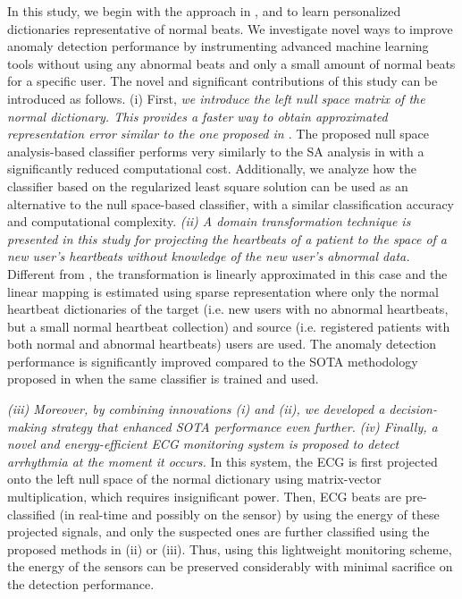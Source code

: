 \documentclass[journal,transmag]{IEEEtran}
\begin{document}
In this study, we begin with the approach in \cite{carrera2016ecg, Elad}, and \cite{carrera2019online} to learn personalized dictionaries representative of normal beats. We investigate novel ways to improve anomaly detection performance by instrumenting advanced machine learning tools without using any abnormal beats and only a small amount of normal beats for a specific user. The novel and significant contributions of this study can be introduced as follows. (i) First, \textit{we introduce the left null space matrix of the normal dictionary. This provides a faster way to obtain approximated representation error similar to the one proposed in \cite{carrera2016ecg, carrera2019online}}. The proposed null space analysis-based classifier performs very similarly to the SA analysis in \cite{carrera2016ecg, carrera2019online} with a significantly reduced computational cost. Additionally, we analyze how the classifier based on the regularized least square solution can be used as an alternative to the null space-based classifier, with a similar classification accuracy and computational complexity.
\textit{(ii) A domain transformation technique is presented in this study for projecting the heartbeats of a patient to the space of a new user's heartbeats without knowledge of the new user's abnormal data.} Different from \cite{kiranyaz2017personalized}, the transformation is linearly approximated in this case and the linear mapping is estimated using sparse representation where only the normal heartbeat dictionaries of the target (i.e. new users with no abnormal heartbeats, but a small normal heartbeat collection) and source (i.e. registered patients with both normal and abnormal heartbeats) users are used. The anomaly detection performance is significantly improved compared to the SOTA methodology proposed in \cite{kiranyaz2017personalized} when the same classifier is trained and used.

\textit{(iii) Moreover, by combining innovations (i) and (ii), we developed a decision-making strategy that enhanced SOTA performance even further.} \textit{(iv) Finally, a novel and energy-efficient ECG monitoring system is proposed to detect arrhythmia at the moment it occurs.} In this system, the ECG is first projected onto the left null space of the normal dictionary using matrix-vector multiplication, which requires insignificant power. Then, ECG beats are pre-classified (in real-time and possibly on the sensor) by using the energy of these projected signals, and only the suspected ones are further classified using the proposed methods in (ii) or (iii). Thus, using this lightweight monitoring scheme, the energy of the sensors can be preserved considerably with minimal sacrifice on the detection performance.
\end{document}
